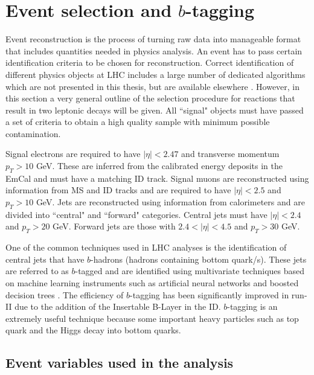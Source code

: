 



\section{Event selection and $b$-tagging}

Event reconstruction is the process of turning raw data into manageable format that includes quantities needed in physics analysis. An event has to pass certain identification criteria to be chosen for reconstruction. Correct identification of different physics objects at LHC includes a large number of dedicated algorithms which are not presented in this thesis, but are available elsewhere \citep{Aad:2016tuk}. 
However, in this section a very general outline of the selection procedure for reactions that result in two leptonic decays will be given. All ``signal" objects must have passed a set of criteria to obtain a high quality sample with minimum possible contamination.

Signal electrons are required to have $|\eta|<2.47$ and transverse momentum $p_{T}>10$ GeV. These are inferred from the calibrated  energy deposits in the EmCal and must have a matching ID track. Signal muons are reconstructed using information from MS and ID tracks and are required to have   $|\eta|<2.5$ and $p_{T}>10$ GeV. Jets are reconstructed using information from calorimeters and are divided into ``central" and ``forward" categories. Central jets must have $|\eta|<2.4$ and $p_{T}>20$ GeV. Forward jets are those with $2.4<|\eta|<4.5$ and $p_{T}>30$ GeV. 

One of the common techniques used in LHC analyses is the identification of central jets that have $b$-hadrons (hadrons containing bottom quark/s).  These jets are referred to as $b$-tagged and are identified using multivariate techniques based on machine learning instruments such as artificial neural networks and boosted decision trees \citep{Aad:2015ydr}. The efficiency of $b$-tagging has been significantly improved in run-II due to the addition of the Insertable B-Layer in the ID. $b$-tagging is an extremely useful technique because some important heavy particles such as top quark and the Higgs decay into bottom quarks.  

\subsection{Event variables used in the analysis}
\label{subsec:Variables}

